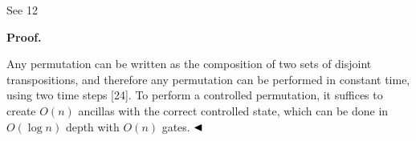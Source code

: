 \documentclass[10pt,a4paper]{amsart}
\begin{document}
 
 
See 12\par
 
 
 
 
\par\medskip\noindent\textbf{Proof.}\par
 
 
Any permutation can be written as the composition of two sets of disjoint transpositions, and therefore any permutation can be performed in constant time, using two time steps [24]. To perform a controlled permutation, it suffices to create $O(n)$ ancillas with the correct controlled state, which can be done in $O(\log n)$ depth with $O(n)$ gates. $\hfill\blacktriangleleft$\par
 
 
 
\end{document}
